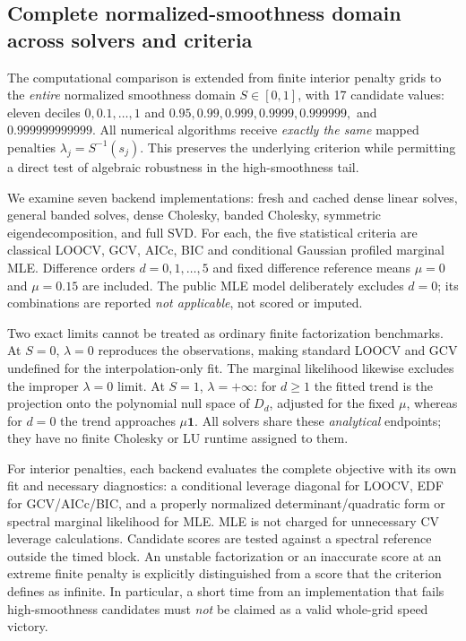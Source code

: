 \subsection{Complete normalized-smoothness domain across solvers and criteria}
\label{sec:full-s-factorial}
The computational comparison is extended from finite interior penalty grids
to the \emph{entire} normalized smoothness domain
$S\in[0,1]$, with 17 candidate values: eleven deciles
$0,0.1,\ldots,1$ and $0.95,0.99,0.999,0.9999,0.999999,$ and
$0.999999999999$. All numerical algorithms receive \emph{exactly the
same} mapped penalties $\lambda_j=S^{-1}(s_j)$. This preserves the
underlying criterion while permitting a direct test of algebraic
robustness in the high-smoothness tail.

We examine seven backend implementations: fresh and cached dense linear
solves, general banded solves, dense Cholesky, banded Cholesky, symmetric
eigendecomposition, and full SVD. For each, the five statistical criteria
are classical LOOCV, GCV, AICc, BIC and conditional Gaussian profiled
marginal MLE. Difference orders $d=0,1,\ldots,5$ and fixed difference
reference means $\mu=0$ and $\mu=0.15$ are included. The public MLE
model deliberately excludes $d=0$; its combinations are reported
\emph{not applicable}, not scored or imputed.

Two exact limits cannot be treated as ordinary finite factorization
benchmarks. At $S=0$, $\lambda=0$ reproduces the observations, making
standard LOOCV and GCV undefined for the interpolation-only fit. The
marginal likelihood likewise excludes the improper $\lambda=0$
limit. At $S=1$, $\lambda=+\infty$: for $d\geq1$ the fitted trend
is the projection onto the polynomial null space of $D_d$, adjusted
for the fixed $\mu$, whereas for $d=0$ the trend approaches
$\mu\mathbf1$. All solvers share these \emph{analytical} endpoints;
they have no finite Cholesky or LU runtime assigned to them.

For interior penalties, each backend evaluates the complete objective
with its own fit and necessary diagnostics: a conditional leverage
diagonal for LOOCV, EDF for GCV/AICc/BIC, and a properly normalized
determinant/quadratic form or spectral marginal likelihood for MLE.
MLE is not charged for unnecessary CV leverage calculations. Candidate
scores are tested against a spectral reference outside the timed block.
An unstable factorization or an inaccurate score at an extreme finite
penalty is explicitly distinguished from a score that the criterion
defines as infinite. In particular, a short time from an implementation
that fails high-smoothness candidates must \emph{not} be claimed as a
valid whole-grid speed victory.

